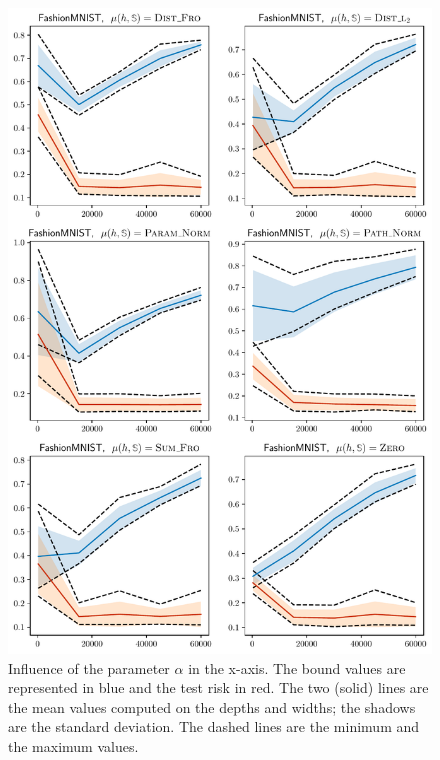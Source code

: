 \begin{noaddcontents}
\begin{figure}
    \centering
    \includegraphics[width=0.77\linewidth]{chapter_7/figures/influence_alpha_fashion.pdf}
    \caption{
    Influence of the parameter $\alpha$ in the x-axis.
    The bound values are represented in blue and the test risk in red. 
    The two (solid) lines are the mean values computed on the depths and widths; the shadows are the standard deviation.
    The dashed lines are the minimum and the maximum values.
    }
    \label{ap:dis-mu:fig:influence-alpha-3}
\end{figure}


\end{noaddcontents}
